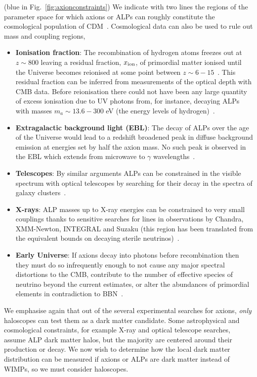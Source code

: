 {\color{Blue}{\bf Cosmological bounds}} (blue in Fig.~\ref{fig:axionconstraints})
We indicate with two lines the regions of the parameter space for which axions or ALPs can roughly constitute the cosmological population of CDM~\cite{Essig:2013lka}. Cosmological data can also be used to rule out mass and coupling regions,\vspace{-1em}
\begin{itemize}\itemsep0em 
 \item{ \bf Ionisation fraction}: The recombination of hydrogen atoms freezes out at $z\sim800$ leaving a residual fraction, $x_{\rm ion}$, of primordial matter ionised until the Universe becomes reionised at some point between $z\sim6-15$~\cite{Zaroubi:2012in}. This residual fraction can be inferred from measurements of the optical depth with CMB data. Before reionisation there could not have been any large quantity of excess ionisation due to UV photons from, for instance, decaying ALPs with masses $m_a \sim 13.6 - 300$ eV (the energy levels of hydrogen)~\cite{Arias:2012az,Cadamuro:2012rm}.
 \item {\bf Extragalactic background light (EBL)}: The decay of ALPs over the age of the Universe would lead to a redshift broadened peak in diffuse background emission at energies set by half the axion mass. No such peak is observed in the EBL which extends from microwave to $\gamma$ wavelengths~\cite{Overduin:2004sz}. 
 \item {\bf Telescopes}: By similar arguments ALPs can be constrained in the visible spectrum with optical telescopes by searching for their decay in the spectra of galaxy clusters~\cite{Grin:2006aw}.
 \item {\bf X-rays}: ALP masses up to X-ray energies can be constrained to very small couplings thanks to sensitive searches for lines in observations by Chandra, XMM-Newton, INTEGRAL and Suzaku (this region has been translated from the equivalent bounds on decaying sterile neutrinos)~\cite{Boyarsky:2009ix}.
 \item {\bf Early Universe}: If axions decay into photons before recombination then they must do so infrequently enough to not cause any major spectral distortions to the CMB, contribute to the number of effective species of neutrino beyond the current estimates, or alter the abundances of primordial elements in contradiction to BBN~\cite{Cadamuro:2012rm}.
\end{itemize}

We emphasise again that out of the several experimental searches for axions, {\it only} haloscopes can test them as a dark matter candidate. Some astrophysical and cosmological constraints, for example X-ray and optical telescope searches, assume ALP dark matter halos, but the majority are centered around their production or decay. We now wish to determine how the local dark matter distribution can be measured if axions or ALPs are dark matter instead of WIMPs, so we must consider haloscopes.


